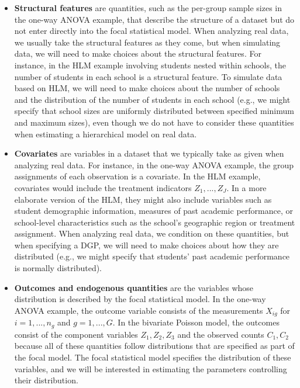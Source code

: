 \documentclass[
]{book}
\providecommand{\tightlist}{%
  \setlength{\itemsep}{0pt}\setlength{\parskip}{0pt}}
\begin{document}
\begin{itemize}
\tightlist
\item
  \textbf{Structural features} are quantities, such as the per-group sample sizes in the one-way ANOVA example, that describe the structure of a dataset but do not enter directly into the focal statistical model.
  When analyzing real data, we usually take the structural features as they come, but when simulating data, we will need to make choices about the structural features.
  For instance, in the HLM example involving students nested within schools, the number of students in each school is a structural feature.
  To simulate data based on HLM, we will need to make choices about the number of schools and the distribution of the number of students in each school (e.g., we might specify that school sizes are uniformly distributed between specified minimum and maximum sizes), even though we do not have to consider these quantities when estimating a hierarchical model on real data.
\item
  \textbf{Covariates} are variables in a dataset that we typically take as given when analyzing real data.
  For instance, in the one-way ANOVA example, the group assignments of each observation is a covariate.
  In the HLM example, covariates would include the treatment indicators \(Z_1,...,Z_J\). In a more elaborate version of the HLM, they might also include variables such as student demographic information, measures of past academic performance, or school-level characteristics such as the school's geographic region or treatment assignment.
  When analyzing real data, we condition on these quantities, but when specifying a DGP, we will need to make choices about how they are distributed (e.g., we might specify that students' past academic performance is normally distributed).
\item
  \textbf{Outcomes and endogenous quantities} are the variables whose distribution is described by the focal statistical model.
  In the one-way ANOVA example, the outcome variable consists of the measurements \(X_{ig}\) for \(i = 1,...,n_g\) and \(g = 1,...,G\).
  In the bivariate Poisson model, the outcomes consist of the component variables \(Z_1,Z_2,Z_3\) and the observed counts \(C_1,C_2\) because all of these quantities follow distributions that are specified as part of the focal model.
  The focal statistical model specifies the distribution of these variables, and we will be interested in estimating the parameters controlling their distribution.
\end{itemize}
\end{document}

